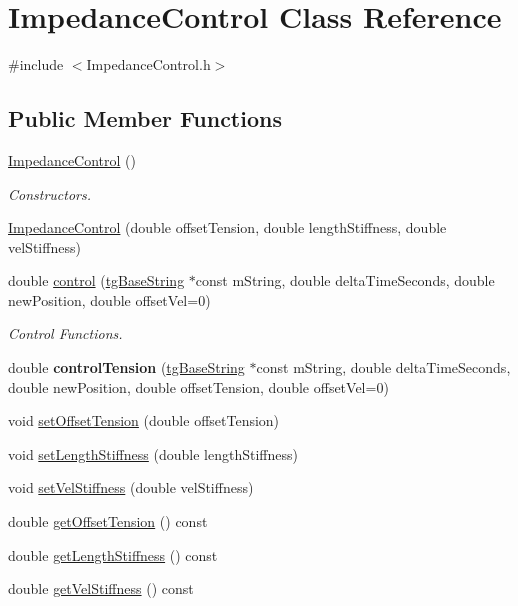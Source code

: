\hypertarget{class_impedance_control}{\section{Impedance\-Control Class Reference}
\label{class_impedance_control}
}


{\ttfamily \#include $<$Impedance\-Control.\-h$>$}

\subsection*{Public Member Functions}
\begin{DoxyCompactItemize}
\item 
\hyperlink{class_impedance_control_a78434a0d1f5f5cfad2e95877cb2dd6f9}{Impedance\-Control} ()
\begin{DoxyCompactList}\small\item\em Constructors. \end{DoxyCompactList}\item 
\hyperlink{class_impedance_control_a4b3568b889640de08f9390d86784bc3f}{Impedance\-Control} (double offset\-Tension, double length\-Stiffness, double vel\-Stiffness)
\item 
double \hyperlink{class_impedance_control_a2fd876daa099a35a108e24d68a253382}{control} (\hyperlink{classtg_base_string}{tg\-Base\-String} $\ast$const m\-String, double delta\-Time\-Seconds, double new\-Position, double offset\-Vel=0)
\begin{DoxyCompactList}\small\item\em Control Functions. \end{DoxyCompactList}\item 
\hypertarget{class_impedance_control_a12ce23d22add7af5ce82b74ded81914d}{double {\bfseries control\-Tension} (\hyperlink{classtg_base_string}{tg\-Base\-String} $\ast$const m\-String, double delta\-Time\-Seconds, double new\-Position, double offset\-Tension, double offset\-Vel=0)}\label{class_impedance_control_a12ce23d22add7af5ce82b74ded81914d}

\item 
void \hyperlink{class_impedance_control_ab511fef8e58cba0bd7c76fed41c3e112}{set\-Offset\-Tension} (double offset\-Tension)
\item 
void \hyperlink{class_impedance_control_a1bc1a40f6b927ddbaad52296f53b5c16}{set\-Length\-Stiffness} (double length\-Stiffness)
\item 
void \hyperlink{class_impedance_control_a2172bf8be8f486fe94a36c110828d948}{set\-Vel\-Stiffness} (double vel\-Stiffness)
\item 
double \hyperlink{class_impedance_control_a827e0a098e5cedd1fd4496bd49deec30}{get\-Offset\-Tension} () const 
\item 
double \hyperlink{class_impedance_control_a06183d51006fcec4ef58b79177197dc6}{get\-Length\-Stiffness} () const 
\item 
double \hyperlink{class_impedance_control_a8763e420a6e9d5b95d1ac026c924068a}{get\-Vel\-Stiffness} () const 
\end{DoxyCompactItemize}
